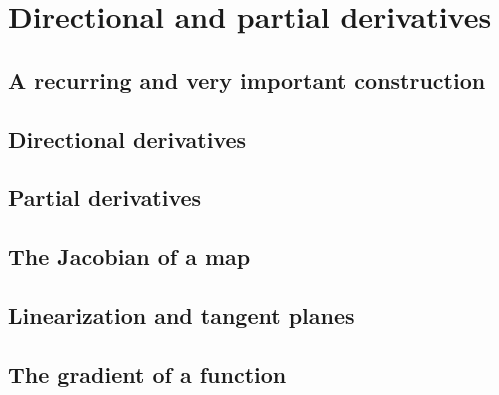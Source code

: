 \section{Directional and partial derivatives}

\subsection{A recurring and very important construction}

\subsection{Directional derivatives}

\subsection{Partial derivatives}

\subsection{The Jacobian of a map}

\subsection{Linearization and tangent planes}

\subsection{The gradient of a function}

